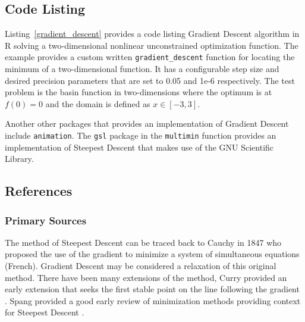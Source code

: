 \subsection{Code Listing}
Listing~\ref{gradient_descent} provides a code listing Gradient Descent algorithm in R solving a two-dimensional nonlinear unconstrained optimization function.
The example provides a custom written \texttt{gradient\_descent} function for locating the minimum of a two-dimensional function. It has a configurable step size and desired precision parameters that are set to 0.05 and 1e-6 respectively.
The test problem is the basin function in two-dimensions where the optimum is at $f(0)=0$ and the domain is defined as $x \in [-3,3]$. 



Another other packages that provides an implementation of Gradient Descent include \texttt{animation}. The \texttt{gsl} package in the \texttt{multimin} function provides an implementation of Steepest Descent that makes use of the GNU Scientific Library.

\subsection{References}

\subsubsection{Primary Sources}
The method of Steepest Descent can be traced back to Cauchy in 1847 who proposed the use of the gradient to minimize a system of simultaneous equations \cite{Cauchy1847} (French). Gradient Descent may be considered a relaxation of this original method.
There have been many extensions of the method, Curry provided an early extension that seeks the first stable point on the line following the gradient \cite{Curry1944}. Spang provided a good early review of minimization methods providing context for Steepest Descent \cite{Spang1962}.

